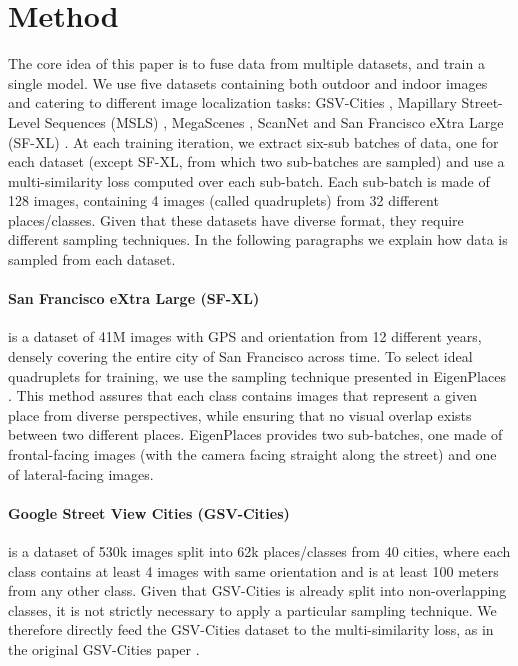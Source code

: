 
\section{Method}
\label{sec:method}

The core idea of this paper is to fuse data from multiple datasets, and train a single model.
We use five datasets containing both outdoor and indoor images and catering to different image localization tasks: GSV-Cities \cite{Alibey_2022_gsvcities}, 
Mapillary Street-Level Sequences (MSLS) \cite{Warburg_2020_msls},
MegaScenes \cite{Tung_2024_Megascenes}, ScanNet \cite{Dai_2017_scannet} and San Francisco eXtra Large (SF-XL) \cite{Berton_2022_cosPlace}. 
At each training iteration, we extract six-sub batches of data, one for each dataset (except SF-XL, from which two sub-batches are sampled) and use a multi-similarity loss \cite{Wang_2019_multi_similarity_loss} computed over each sub-batch.
Each sub-batch is made of 128 images, containing 4 images (called quadruplets) from 32 different places/classes.
Given that these datasets have diverse format, they require different sampling techniques.
In the following paragraphs we explain how data is sampled from each dataset.


\paragraph{San Francisco eXtra Large (SF-XL)} is a dataset of 41M images with GPS and orientation from 12 different years, densely covering the entire city of San Francisco across time.
To select ideal quadruplets for training, we use the sampling technique presented in EigenPlaces \cite{Berton_2023_EigenPlaces}.
This method assures that each class contains images that represent a given place from diverse perspectives, while ensuring that no visual overlap exists between two different places.
EigenPlaces provides two sub-batches, one made of frontal-facing images (\ie with the camera facing straight along the street) and one of lateral-facing images.

\paragraph{Google Street View Cities (GSV-Cities)} is a dataset of 530k images split into 62k places/classes from 40 cities, where each class contains at least 4 images with same orientation and is at least 100 meters from any other class.
Given that GSV-Cities is already split into non-overlapping classes, it is not strictly necessary to apply a particular sampling technique.
We therefore directly feed the GSV-Cities dataset to the multi-similarity loss, as in the original GSV-Cities paper \cite{Alibey_2022_gsvcities}.

